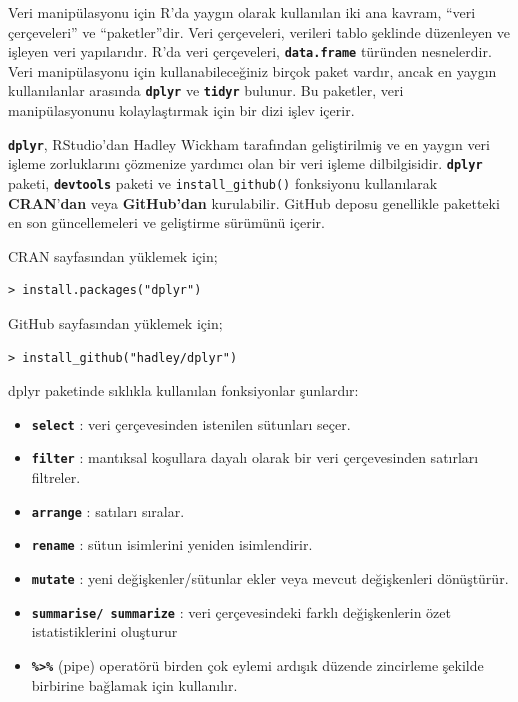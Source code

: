 \documentclass[
  letterpaper,
  DIV=11,
  numbers=noendperiod]{scrreprt}
\begin{document}
Veri manipülasyonu için R'da yaygın olarak kullanılan iki ana kavram,
``veri çerçeveleri'' ve ``paketler''dir. Veri çerçeveleri, verileri
tablo şeklinde düzenleyen ve işleyen veri yapılarıdır. R'da veri
çerçeveleri, \textbf{\texttt{data.frame}} türünden nesnelerdir. Veri
manipülasyonu için kullanabileceğiniz birçok paket vardır, ancak en
yaygın kullanılanlar arasında \textbf{\texttt{dplyr}} ve
\textbf{\texttt{tidyr}} bulunur. Bu paketler, veri manipülasyonunu
kolaylaştırmak için bir dizi işlev içerir.

\textbf{\texttt{dplyr}}, RStudio'dan Hadley Wickham tarafından
geliştirilmiş ve en yaygın veri işleme zorluklarını çözmenize yardımcı
olan bir veri işleme dilbilgisidir. \textbf{\texttt{dplyr}} paketi,
\textbf{\texttt{devtools}} paketi ve \texttt{install\_github()}
fonksiyonu kullanılarak \textbf{CRAN}'\textbf{dan} veya
\textbf{GitHub'dan} kurulabilir. GitHub deposu genellikle paketteki en
son güncellemeleri ve geliştirme sürümünü içerir.

CRAN sayfasından yüklemek için;

\begin{verbatim}
> install.packages("dplyr")
\end{verbatim}

GitHub sayfasından yüklemek için;

\begin{verbatim}
> install_github("hadley/dplyr")
\end{verbatim}

dplyr paketinde sıklıkla kullanılan fonksiyonlar şunlardır:

\begin{itemize}
\item
  \textbf{\texttt{select}} : veri çerçevesinden istenilen sütunları
  seçer.
\item
  \textbf{\texttt{filter}} : mantıksal koşullara dayalı olarak bir veri
  çerçevesinden satırları filtreler.
\item
  \textbf{\texttt{arrange}} : satıları sıralar.
\item
  \textbf{\texttt{rename}} : sütun isimlerini yeniden isimlendirir.
\item
  \textbf{\texttt{mutate}} : yeni değişkenler/sütunlar ekler veya mevcut
  değişkenleri dönüştürür.
\item
  \textbf{\texttt{summarise/\ summarize}} : veri çerçevesindeki farklı
  değişkenlerin özet istatistiklerini oluşturur
\item
  \textbf{\texttt{\%\textgreater{}\%}} (pipe) operatörü birden çok
  eylemi ardışık düzende zincirleme şekilde birbirine bağlamak için
  kullanılır.
\end{itemize}
\end{document}
